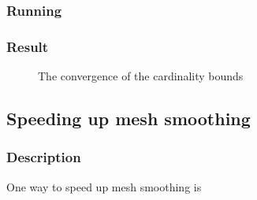 \documentclass[paper=a4, fontsize=11pt]{scrartcl} %
\numberwithin{equation}{section} %
\numberwithin{figure}{section} %
\numberwithin{table}{section} %
\begin{document}
\subsubsection{Running}

\subsubsection{Result}

\begin{figure}[H]
\caption{The convergence of the cardinality bounds\label{fig:simple}}
\noindent{}
\end{figure} 

\subsection{Speeding up mesh smoothing}

\subsubsection{Description}

One way to speed up mesh smoothing is ~
\end{document}
